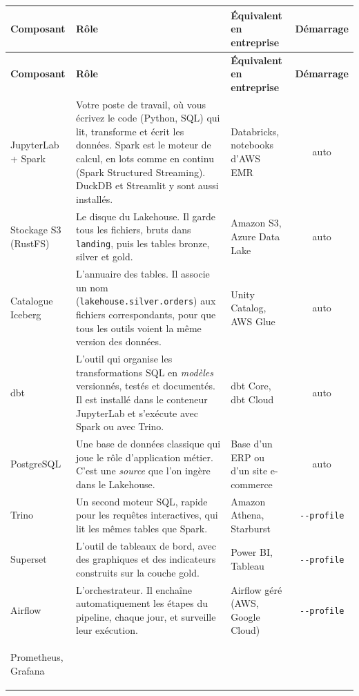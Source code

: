 \documentclass[11pt,a4paper]{article}
\begin{document}
{\small
\renewcommand{\arraystretch}{1.3}
\begin{xltabular}{\textwidth}{@{}>{\bfseries\raggedright\arraybackslash}p{2.9cm}
  >{\raggedright\arraybackslash}X >{\raggedright\arraybackslash}p{3.2cm} c@{}}
\toprule
\normalfont\textbf{Composant} & \textbf{Rôle} & \textbf{Équivalent en entreprise} & \textbf{Démarrage} \\
\midrule
\endfirsthead
\toprule
\normalfont\textbf{Composant} & \textbf{Rôle} & \textbf{Équivalent en entreprise} & \textbf{Démarrage} \\
\midrule
\endhead
\bottomrule
\endfoot
JupyterLab + Spark &
  Votre poste de travail, où vous écrivez le code (Python, SQL) qui lit, transforme et écrit
  les données. Spark est le moteur de calcul, en lots comme en continu (Spark Structured
  Streaming). DuckDB et Streamlit y sont aussi installés. &
  Databricks, notebooks d'AWS EMR & auto \\
Stockage S3 (RustFS) &
  Le disque du Lakehouse. Il garde tous les fichiers, bruts dans \texttt{landing}, puis
  les tables bronze, silver et gold. &
  Amazon S3, Azure Data Lake & auto \\
Catalogue Iceberg &
  L'annuaire des tables. Il associe un nom (\texttt{lakehouse.silver.orders}) aux fichiers
  correspondants, pour que tous les outils voient la même version des données. &
  Unity Catalog, AWS Glue & auto \\
dbt &
  L'outil qui organise les transformations SQL en \emph{modèles} versionnés, testés et
  documentés. Il est installé dans le conteneur JupyterLab et s'exécute avec Spark ou avec Trino. &
  dbt Core, dbt Cloud & auto \\
PostgreSQL &
  Une base de données classique qui joue le rôle d'application métier. C'est une
  \emph{source} que l'on ingère dans le Lakehouse. &
  Base d'un ERP ou d'un site e-commerce & auto \\
Trino &
  Un second moteur SQL, rapide pour les requêtes interactives, qui lit les mêmes tables
  que Spark. &
  Amazon Athena, Starburst & \texttt{-{}-profile} \\
Superset &
  L'outil de tableaux de bord, avec des graphiques et des indicateurs construits sur la couche gold. &
  Power BI, Tableau & \texttt{-{}-profile} \\
Airflow &
  L'orchestrateur. Il enchaîne automatiquement les étapes du pipeline, chaque jour, et
  surveille leur exécution. &
  Airflow géré (AWS, Google Cloud) & \texttt{-{}-profile} \\
Prometheus, Grafana &

\end{xltabular}}
\end{document}

